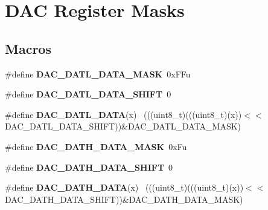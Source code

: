 \hypertarget{group___d_a_c___register___masks}{}\section{D\+A\+C Register Masks}
\label{group___d_a_c___register___masks}
\subsection*{Macros}
\begin{DoxyCompactItemize}
\item 
\hypertarget{group___d_a_c___register___masks_ga1874318b69ed4b2d190e887ed43e39bf}{}\#define {\bfseries D\+A\+C\+\_\+\+D\+A\+T\+L\+\_\+\+D\+A\+T\+A\+\_\+\+M\+A\+S\+K}~0x\+F\+Fu\label{group___d_a_c___register___masks_ga1874318b69ed4b2d190e887ed43e39bf}

\item 
\hypertarget{group___d_a_c___register___masks_ga3c93e96482e5e842d2232a78bcdefa17}{}\#define {\bfseries D\+A\+C\+\_\+\+D\+A\+T\+L\+\_\+\+D\+A\+T\+A\+\_\+\+S\+H\+I\+F\+T}~0\label{group___d_a_c___register___masks_ga3c93e96482e5e842d2232a78bcdefa17}

\item 
\hypertarget{group___d_a_c___register___masks_ga2923650bda04d892a226840bdadaeec7}{}\#define {\bfseries D\+A\+C\+\_\+\+D\+A\+T\+L\+\_\+\+D\+A\+T\+A}(x)                                              ~(((uint8\+\_\+t)(((uint8\+\_\+t)(x))$<$$<$D\+A\+C\+\_\+\+D\+A\+T\+L\+\_\+\+D\+A\+T\+A\+\_\+\+S\+H\+I\+F\+T))\&D\+A\+C\+\_\+\+D\+A\+T\+L\+\_\+\+D\+A\+T\+A\+\_\+\+M\+A\+S\+K)\label{group___d_a_c___register___masks_ga2923650bda04d892a226840bdadaeec7}

\item 
\hypertarget{group___d_a_c___register___masks_ga2d3ae44d77c6c039e134b60f5d0b8c70}{}\#define {\bfseries D\+A\+C\+\_\+\+D\+A\+T\+H\+\_\+\+D\+A\+T\+A\+\_\+\+M\+A\+S\+K}~0x\+Fu\label{group___d_a_c___register___masks_ga2d3ae44d77c6c039e134b60f5d0b8c70}

\item 
\hypertarget{group___d_a_c___register___masks_ga108839fa938503d4fe96793470af0565}{}\#define {\bfseries D\+A\+C\+\_\+\+D\+A\+T\+H\+\_\+\+D\+A\+T\+A\+\_\+\+S\+H\+I\+F\+T}~0\label{group___d_a_c___register___masks_ga108839fa938503d4fe96793470af0565}

\item 
\hypertarget{group___d_a_c___register___masks_ga309894cfd52375341853b92ef9ce427c}{}\#define {\bfseries D\+A\+C\+\_\+\+D\+A\+T\+H\+\_\+\+D\+A\+T\+A}(x)                                              ~(((uint8\+\_\+t)(((uint8\+\_\+t)(x))$<$$<$D\+A\+C\+\_\+\+D\+A\+T\+H\+\_\+\+D\+A\+T\+A\+\_\+\+S\+H\+I\+F\+T))\&D\+A\+C\+\_\+\+D\+A\+T\+H\+\_\+\+D\+A\+T\+A\+\_\+\+M\+A\+S\+K)\label{group___d_a_c___register___masks_ga309894cfd52375341853b92ef9ce427c}


\end{DoxyCompactItemize}
